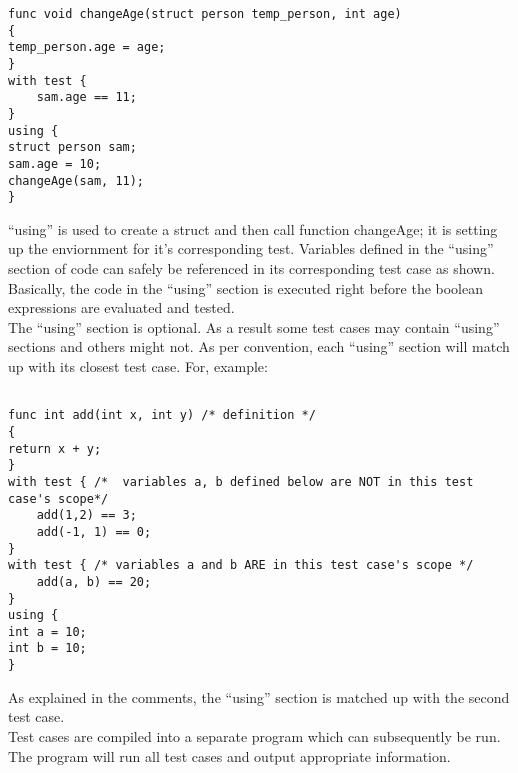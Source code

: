 \documentclass{article}
\begin{document}
\begin{lstlisting}
func void changeAge(struct person temp_person, int age)
{
temp_person.age = age;
}
with test {
	sam.age == 11;
}
using {
struct person sam;
sam.age = 10;
changeAge(sam, 11);
}
\end{lstlisting}
``using'' is used to create a struct and then call function changeAge; it is setting up the enviornment for it's corresponding test. Variables defined in the ``using'' section of code can safely be referenced in its corresponding test case as shown. Basically, the code in the ``using'' section is executed right before the boolean expressions are evaluated and tested. \\
The ``using'' section is optional. As a result some test cases may contain ``using'' sections and others might not. As per convention, each ``using'' section will match up with its closest test case. For, example:

\begin{lstlisting}

func int add(int x, int y) /* definition */
{
return x + y;
}
with test { /*  variables a, b defined below are NOT in this test case's scope*/
	add(1,2) == 3;
	add(-1, 1) == 0;
}
with test { /* variables a and b ARE in this test case's scope */
	add(a, b) == 20;
}
using {
int a = 10;
int b = 10;
}

\end{lstlisting}

As explained in the comments, the ``using'' section is matched up with the second test case.
\\
Test cases are compiled into a separate program which can subsequently be run. The program will run all test cases and output appropriate information. 
\end{document}
